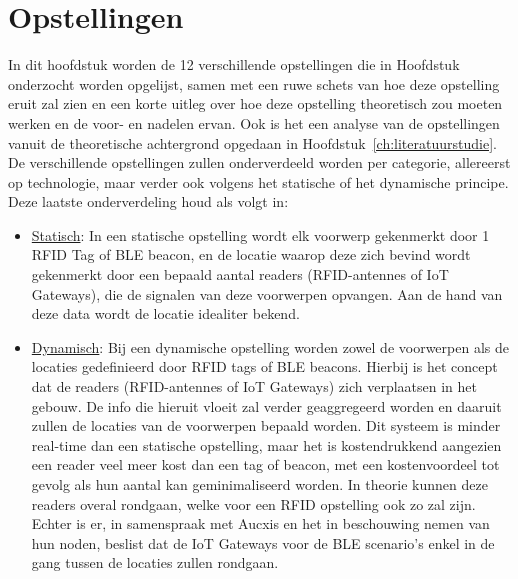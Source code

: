 \chapter{Opstellingen}
\label{ch:opstellingen}

In dit hoofdstuk worden de 12 verschillende opstellingen die in Hoofdstuk~\label{ch:testen} onderzocht worden opgelijst, samen met een ruwe schets van hoe deze opstelling eruit zal zien en een korte uitleg over hoe deze opstelling theoretisch zou moeten werken en de voor- en nadelen ervan. Ook is het een analyse van de opstellingen vanuit de theoretische achtergrond opgedaan in Hoofdstuk~\ref{ch:literatuurstudie}. De verschillende opstellingen zullen onderverdeeld worden per categorie, allereerst op technologie, maar verder ook volgens het statische of het dynamische principe. 
Deze laatste onderverdeling houd als volgt in:
\begin{itemize}
	\item \underline{Statisch}:
	In een statische opstelling wordt elk voorwerp gekenmerkt door 1 RFID Tag of BLE beacon, en de locatie waarop deze zich bevind wordt gekenmerkt door een bepaald aantal readers (RFID-antennes of IoT Gateways), die de signalen van deze voorwerpen opvangen. Aan de hand van deze data wordt de locatie idealiter bekend.
	\item \underline{Dynamisch}:
	Bij een dynamische opstelling worden zowel de voorwerpen als de locaties gedefinieerd door RFID tags of BLE beacons. Hierbij is het concept dat de readers (RFID-antennes of IoT Gateways) zich verplaatsen in het gebouw. De info die hieruit vloeit zal verder geaggregeerd worden en daaruit zullen de locaties van de voorwerpen bepaald worden. Dit systeem is minder real-time dan een statische opstelling, maar het is kostendrukkend aangezien een reader veel meer kost dan een tag of beacon, met een kostenvoordeel tot gevolg als hun aantal kan geminimaliseerd worden.
	In theorie kunnen deze readers overal rondgaan, welke voor een RFID opstelling ook zo zal zijn. Echter is er, in samenspraak met Aucxis en het in beschouwing nemen van hun noden, beslist dat de IoT Gateways voor de BLE scenario's enkel in de gang tussen de locaties zullen rondgaan.
\end{itemize}


